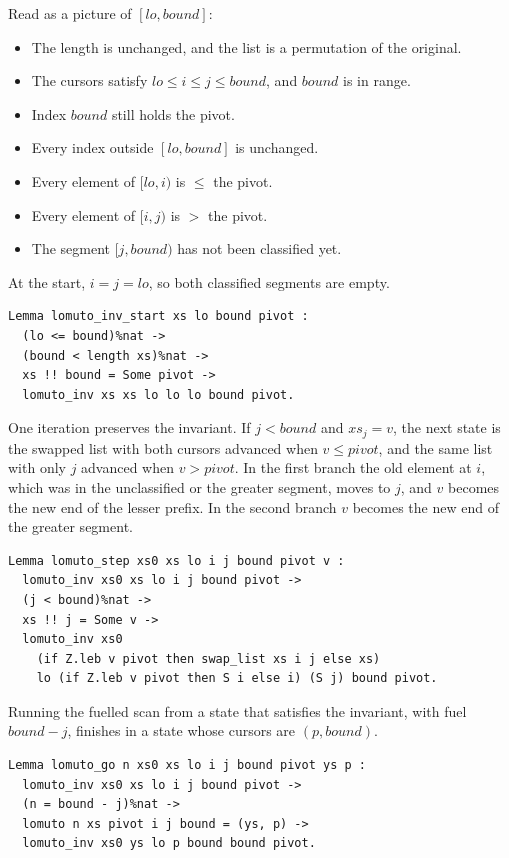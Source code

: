 \documentclass[11pt]{article}
\begin{document}
Read as a picture of \([lo, \mathit{bound}]\):

\begin{itemize}
\item The length is unchanged, and the list is a permutation of the original.
\item The cursors satisfy \(lo \le i \le j \le \mathit{bound}\), and \(\mathit{bound}\) is in range.
\item Index \(\mathit{bound}\) still holds the pivot.
\item Every index outside \([lo, \mathit{bound}]\) is unchanged.
\item Every element of \([lo, i)\) is \(\le\) the pivot.
\item Every element of \([i, j)\) is \(>\) the pivot.
\item The segment \([j, \mathit{bound})\) has not been classified yet.
\end{itemize}

At the start, \(i = j = lo\), so both classified segments are empty.

\begin{lstlisting}
Lemma lomuto_inv_start xs lo bound pivot :
  (lo <= bound)%nat ->
  (bound < length xs)%nat ->
  xs !! bound = Some pivot ->
  lomuto_inv xs xs lo lo lo bound pivot.
\end{lstlisting}

One iteration preserves the invariant.
If \(j < \mathit{bound}\) and \(xs_j = v\), the next state is the swapped list with both cursors advanced when \(v \le \mathit{pivot}\), and the same list with only \(j\) advanced when \(v > \mathit{pivot}\).
In the first branch the old element at \(i\), which was in the unclassified or the greater segment, moves to \(j\), and \(v\) becomes the new end of the lesser prefix.
In the second branch \(v\) becomes the new end of the greater segment.

\begin{lstlisting}
Lemma lomuto_step xs0 xs lo i j bound pivot v :
  lomuto_inv xs0 xs lo i j bound pivot ->
  (j < bound)%nat ->
  xs !! j = Some v ->
  lomuto_inv xs0
    (if Z.leb v pivot then swap_list xs i j else xs)
    lo (if Z.leb v pivot then S i else i) (S j) bound pivot.
\end{lstlisting}

Running the fuelled scan from a state that satisfies the invariant, with fuel \(\mathit{bound} - j\), finishes in a state whose cursors are \((p, \mathit{bound})\).

\begin{lstlisting}
Lemma lomuto_go n xs0 xs lo i j bound pivot ys p :
  lomuto_inv xs0 xs lo i j bound pivot ->
  (n = bound - j)%nat ->
  lomuto n xs pivot i j bound = (ys, p) ->
  lomuto_inv xs0 ys lo p bound bound pivot.
\end{lstlisting}
\end{document}
